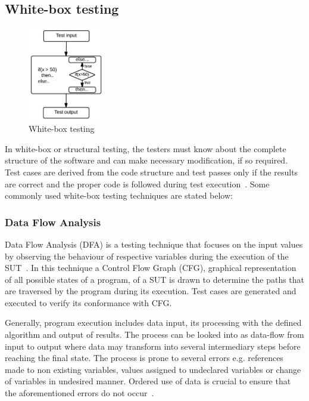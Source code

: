 \subsection{White-box testing}
\begin{figure}
  \vspace{-35pt}
  \begin{center}
    \includegraphics[width=0.30\textwidth]{chapter2/whiteBox.png}
  \end{center}
  \vspace{-20pt}
  \bigskip
  \caption{White-box testing}
  \label{fig:blackBox}
  \vspace{-18pt}
\end{figure}
In white-box or structural testing, the testers must know about the complete structure of the software and can make necessary modification, if so required. Test cases are derived from the code structure and test passes only if the results are correct and the proper code is followed during test execution~\cite{ostrand2002white}. Some commonly used white-box testing techniques are stated below:

\subsubsection{Data Flow Analysis}
Data Flow Analysis (DFA) is a testing technique that focuses on the input values by observing the behaviour of respective variables during the execution of the SUT~\cite{clarke1989formal}. In this technique a Control Flow Graph (CFG), graphical representation of all possible states of a program, of a SUT is drawn to determine the paths that are traversed by the program during its execution. Test cases are generated and executed to verify its conformance with CFG. 

Generally, program execution includes data input, its processing with the defined algorithm and output of results. The process can be looked into as data-flow from input to output where data may transform into several intermediary steps before reaching the final state. The process is prone to several errors e.g. references made to non existing variables, values assigned to undeclared variables or change of variables in undesired manner. Ordered use of data is crucial to ensure that the aforementioned errors do not occur~\cite{fosdick1976data}.

